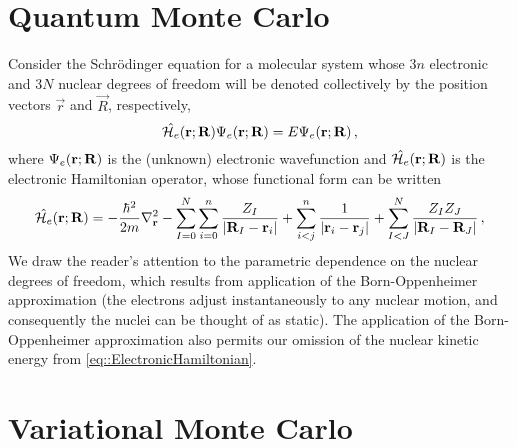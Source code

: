 \section{Quantum Monte Carlo}
Consider the Schr\"{o}dinger equation for a molecular system whose $3n$ electronic
and $3N$ nuclear degrees of freedom will be denoted collectively by the position
vectors $\vec{r}$ and $\vec{R}$, respectively,
%
\begin{equation}
  \hat{\mathcal{H}_e}(\mathbf{r};\mathbf{R})\Psi_e(\mathbf{r};\mathbf{R}) = E\Psi_e(\mathbf{r};\mathbf{R}) \,,
\end{equation}
%
where $\Psi_e(\mathbf{r};\mathbf{R})$ is the (unknown) electronic wavefunction and $\hat{\mathcal{H}_e}(\mathbf{r};\mathbf{R})$ is the
electronic Hamiltonian operator, whose functional form can be written
%
\begin{equation}\label{eq::ElectronicHamiltonian}
  \hat{\mathcal{H}_e}(\mathbf{r};\mathbf{R}) =
  -\frac{\hbar^2}{2m}\nabla^2_{\mathbf{r}}
  - \sum_{I=0}^N\sum_{i=0}^n \frac{Z_I}{|\mathbf{R}_I - \mathbf{r}_i|}
  + \sum_{i<j}^n \frac{1}{|\mathbf{r}_i - \mathbf{r}_j|}
  + \sum_{I<J}^N \frac{Z_IZ_J}{|\mathbf{R}_I - \mathbf{R}_J|} \,,
\end{equation}
%
We draw the reader's attention to the parametric dependence on the nuclear
degrees of freedom, which results from application of the Born-Oppenheimer
approximation (the electrons adjust instantaneously to any nuclear motion, and
consequently the nuclei can be thought of as static). The application of the
Born-Oppenheimer approximation also permits our omission of the nuclear kinetic
energy from \eqref{eq::ElectronicHamiltonian}.

\section{Variational Monte Carlo}
